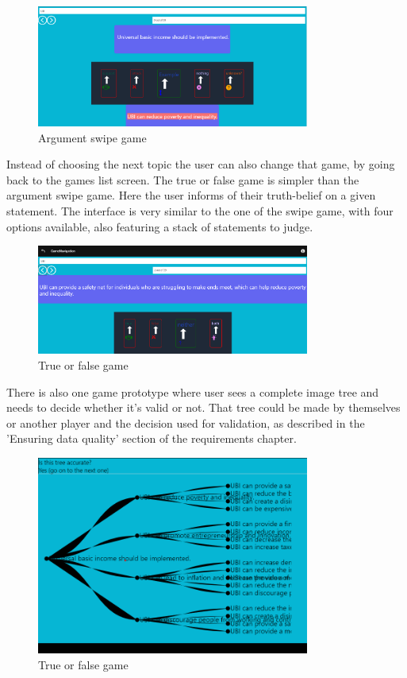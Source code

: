 \documentclass{report}
\begin{document}
\begin{figure}[h]
    \centering
    \includegraphics[width=0.8\textwidth]{./images/swipe-game.png}
    \caption{Argument swipe game}
\end{figure}
Instead of choosing the next topic the user can also change that game, by going back to the games list screen. 
The true or false game is simpler than the argument swipe game. Here the user informs of their truth-belief on a given statement. The interface is very similar to the one of the swipe game, with four options available, also featuring a stack of statements to judge.

\begin{figure}[h]
    \centering
    \includegraphics[width=0.8\textwidth]{./images/truth-game-2.png}
    \caption{True or false game}
\end{figure}

There is also one game prototype where user sees a complete image tree and needs to decide whether it's valid or not. That tree could be made by themselves or another player and the decision used for validation, as described in the 'Ensuring data quality' section of the requirements chapter.

\begin{figure}[h]
    \centering
    \includegraphics[width=0.8\textwidth]{./images/tree.png}
    \caption{True or false game}
\end{figure}
\end{document}
